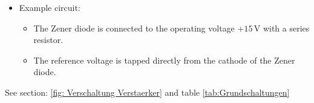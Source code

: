 {\begin{itemize}
    \item Example circuit:
    \begin{itemize}
        \item The Zener diode is connected to the operating voltage $+15\,\mathrm{V}$ with a series resistor.
        \item The reference voltage is tapped directly from the cathode of the Zener diode.
    \end{itemize}
\end{itemize}
\begin{figure}[H]
    \centering
    
    \label{fig:LsgAkkuUeberwachung4}
\end{figure}
See section: \ref{fig: Verschaltung Verstaerker} and table \ref{tab:Grundschaltungen}
%    
%    
%    
%    
%    
%    
%    
%    
%    
%    
%    
}
